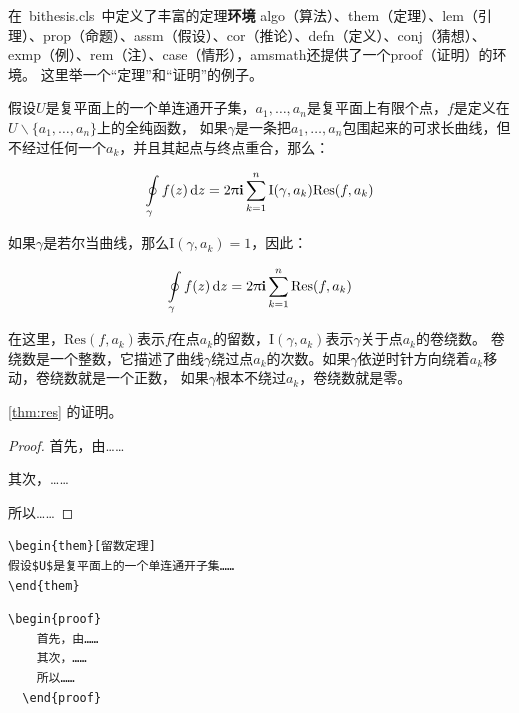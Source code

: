 在~bithesis.cls~中定义了丰富的定理\textbf{环境}
algo（算法）、them（定理）、lem（引理）、prop（命题）、assm（假设）、cor（推论）、defn（定义）、conj（猜想）、exmp（例）、rem（注）、case（情形），amsmath还提供了一个proof（证明）的环境。
这里举一个“定理”和“证明”的例子。
\begin{them}[留数定理]
\label{thm:res}
  假设$U$是复平面上的一个单连通开子集，$a_1,\ldots,a_n$是复平面上有限个点，$f$是定义在$U\backslash \{a_1,\ldots,a_n\}$上的全纯函数，
  如果$\gamma$是一条把$a_1,\ldots,a_n$包围起来的可求长曲线，但不经过任何一个$a_k$，并且其起点与终点重合，那么：

  \begin{equation}
    \label{eq:res}
    \ointop_{\gamma}f(z)\,\mathrm{d}z = 2\uppi\mathbf{i}\sum^n_{k=1}\mathrm{I}(\gamma,a_k)\mathrm{Res}(f,a_k)
  \end{equation}

  如果$\gamma$是若尔当曲线，那么$\mathrm{I}(\gamma, a_k)=1$，因此：

  \begin{equation}
    \label{eq:resthm}
    \ointop_{\gamma}f(z)\,\mathrm{d}z = 2\uppi\mathbf{i}\sum^n_{k=1}\mathrm{Res}(f,a_k)
  \end{equation}

  在这里，$\mathrm{Res}(f, a_k)$表示$f$在点$a_k$的留数，$\mathrm{I}(\gamma,a_k)$表示$\gamma$关于点$a_k$的卷绕数。
  卷绕数是一个整数，它描述了曲线$\gamma$绕过点$a_k$的次数。如果$\gamma$依逆时针方向绕着$a_k$移动，卷绕数就是一个正数，
  如果$\gamma$根本不绕过$a_k$，卷绕数就是零。

  \cref{thm:res} 的证明。

  \begin{proof}
    首先，由……

    其次，……

    所以……
  \end{proof}

\end{them}

\begin{lstlisting}[language={[LaTeX]TeX}, caption={定理环境}]
\begin{them}[留数定理]
假设$U$是复平面上的一个单连通开子集……
\end{them}
\end{lstlisting}

\begin{lstlisting}[language={[LaTeX]TeX}, caption={证明环境}]
  \begin{proof}
    首先，由……
    其次，……
    所以……
  \end{proof}
\end{lstlisting}

